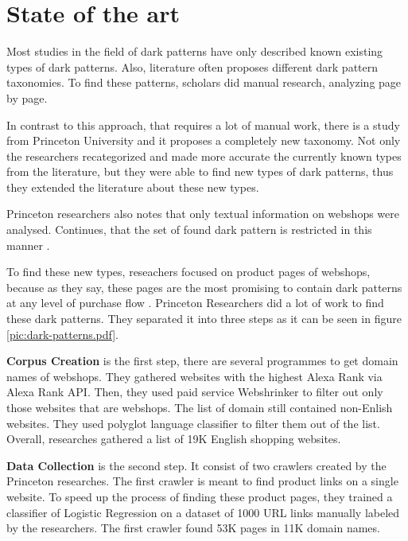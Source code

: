 \chapter{State of the art}
Most studies \cite{dark-patterns-brignull} \cite{dark-patterns-colin} in the field of dark patterns have only described known existing types of dark patterns. Also, literature often proposes different dark pattern taxonomies. To find these patterns, scholars did manual research, analyzing page by page.

In contrast to this approach, that requires a lot of manual work, there is a study from Princeton University \cite{dark-patterns-at-scale} and it proposes a completely new taxonomy. Not only the researchers recategorized and made more accurate the currently known types from the literature, but they were able to find new types of dark patterns, thus they extended the literature about these new types.

Princeton researchers also notes that only textual information on webshops were analysed. Continues, that the set of found dark pattern is restricted in this manner \cite{dark-patterns-at-scale}.

To find these new types, reseachers focused on product pages of webshops, because as they say, these pages are the most promising to contain dark patterns at any level of purchase flow \cite{dark-patterns-at-scale}. Princeton Researchers did a lot of work to find these dark patterns. They separated it into three steps as it can be seen in figure \ref{pic:dark-patterns.pdf}.


\textbf{Corpus Creation} is the first step, there are several programmes to get domain names of webshops. They gathered websites with the highest Alexa Rank via Alexa Rank API. Then, they used paid service Webshrinker to filter out only those websites that are webshops. The list of domain still contained non-Enlish websites. They used polyglot language classifier to filter them out of the list. Overall, researches gathered a list of 19K English shopping websites\cite{dark-patterns-at-scale}.

\textbf{Data Collection} is the second step. It consist of two crawlers created by the Princeton researches. The first crawler is meant to find product links on a single website. To speed up the process of finding these product pages, they trained a classifier of Logistic Regression on a dataset of 1000 URL links manually labeled by the researchers. The first crawler found 53K pages in 11K domain names.

